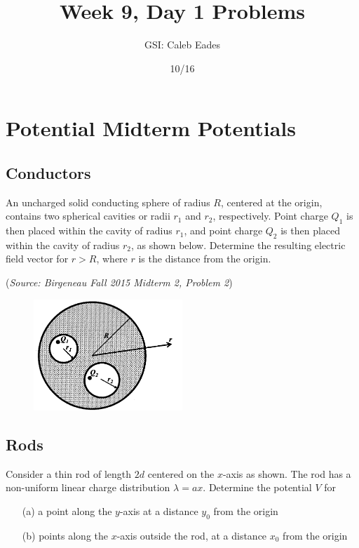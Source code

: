 \documentclass{article}
\begin{document}
\title{Week 9, Day 1 Problems}
\author{GSI: Caleb Eades}
\date{10/16}
\maketitle

\section{Potential Midterm Potentials}

\subsection{Conductors}

An uncharged solid conducting sphere of radius $R$, centered at the origin, contains two spherical cavities or radii $r_1$ and $r_2$, respectively. Point charge $Q_1$ is then placed within the cavity of radius $r_1$, and point charge $Q_2$ is then placed within the cavity of radius $r_2$, as shown below. Determine the resulting electric field vector for $r>R$, where $r$ is the distance from the origin.

(\textit{Source: Birgeneau Fall 2015 Midterm 2, Problem 2})

\begin{figure}[h]
	\begin{center}
	\includegraphics[width=0.5\textwidth]{ConductorMid.png}
	\end{center}
\end{figure}

\subsection{Rods}

Consider a thin rod of length $2d$ centered on the $x$-axis as shown. The rod has a non-uniform linear charge distribution $\lambda=ax$. Determine the potential $V$ for
\begin{itemize}
	\item[(a)] a point along the $y$-axis at a distance $y_0$ from the origin
	\item[(b)] points along the $x$-axis outside the rod, at a distance $x_0$ from the origin
\end{itemize}
\end{document}
